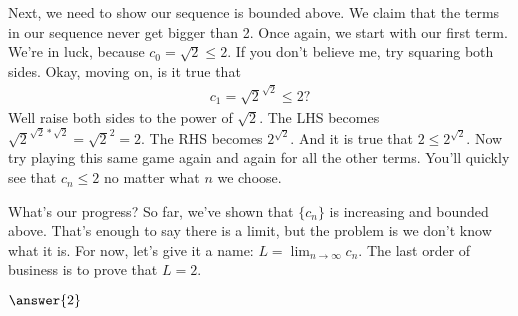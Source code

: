 \documentclass{ximera}
\begin{document}
\begin{exercise}
	\begin{exercise}
		Next, we need to show our sequence is bounded above. We claim that the terms in our sequence never get bigger than 2. Once again, we start with our first term. We're in luck, because $c_0=\sqrt{2} \leq 2$. If you don't believe me, try squaring both sides. Okay, moving on, is it true that
		\begin{align*}
			c_{1}=\sqrt{2}^{\sqrt{2}} \leq 2?
		\end{align*}
		Well raise both sides to the power of $\sqrt{2}$. The LHS becomes $\sqrt{2}^{\sqrt{2}*\sqrt{2}} = \sqrt{2}^2=2$. The RHS becomes $2^{\sqrt{2}}$. And it is true that $2\leq 2^{\sqrt{2}}$. Now try playing this same game again and again for all the other terms. You'll quickly see that $c_n \leq 2$ no matter what $n$ we choose.		
	\end{exercise}
	
	What's our progress? So far, we've shown that $\{c_n\}$ is increasing and bounded above. That's enough to say there is a limit, but the problem is we don't know what it is. For now, let's give it a name: $L = \lim_{n \to \infty} c_{n}$. The last order of business is to prove that $L=2$.
	
	$\answer{2}$
	
	
	
	
	
	
\end{exercise}
\end{document}
